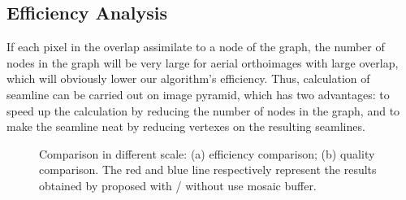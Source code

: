 \documentclass[journal]{IEEEtran}
\begin{document}
\subsection{Efficiency Analysis}
If each pixel in the overlap assimilate to a node of the graph, the number of nodes in the graph will be very large for aerial orthoimages with large overlap, which will obviously lower our algorithm's efficiency. Thus, calculation of seamline can be carried out on image pyramid, which has two advantages: to speed up the calculation by reducing the number of nodes in the graph, and to make the seamline neat by reducing vertexes on the resulting seamlines.
\begin{figure}[!t]
    \centering
    \caption{Comparison in different scale: (a) efficiency comparison; (b) quality comparison. The red and blue line respectively represent the results obtained by proposed with / without use mosaic buffer. }
    \label{fig:seamline-efficiency-comparison}
\end{figure}
\end{document}
